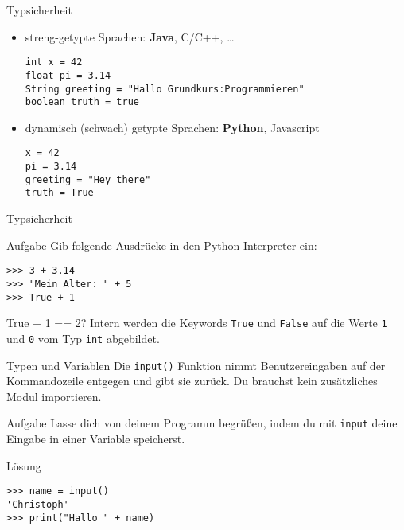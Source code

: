 \begin{frame}[fragile]{Typsicherheit}
 \begin{itemize}
    \item streng-getypte Sprachen: \textbf{Java}, C/C++, \dots
    \begin{lstlisting}
int x = 42
float pi = 3.14
String greeting = "Hallo Grundkurs:Programmieren"
boolean truth = true
    \end{lstlisting}
    \item dynamisch (schwach) getypte Sprachen: \textbf{Python}, Javascript
    \begin{lstlisting}
x = 42
pi = 3.14
greeting = "Hey there"
truth = True
    \end{lstlisting}
\end{itemize}   
\end{frame}

\begin{frame}[fragile]{Typsicherheit}
\begin{block}{Aufgabe}
Gib folgende Ausdrücke in den Python Interpreter ein:
\begin{lstlisting}
>>> 3 + 3.14
>>> "Mein Alter: " + 5
>>> True + 1
\end{lstlisting}
\end{block}
\pause{}
\begin{exampleblock}{True + 1 == 2?}
Intern werden die Keywords \lstinline{True} und \lstinline{False} auf die 
Werte \texttt{1} und \texttt{0} vom Typ \texttt{int} abgebildet.
\end{exampleblock}

\end{frame}


\begin{frame}[fragile]{Typen und Variablen}
    Die \lstinline{input()} Funktion nimmt Benutzereingaben auf der Kommandozeile 
    entgegen und gibt sie zurück. Du brauchst kein zusätzliches Modul importieren.
    \begin{block}{Aufgabe}
       Lasse dich von deinem Programm begrüßen, indem du mit \texttt{input} deine 
       Eingabe in einer Variable speicherst.
    \end{block}
    \pause{}
    \begin{exampleblock}{Lösung}
        \begin{lstlisting}
>>> name = input()
'Christoph'
>>> print("Hallo " + name)
        \end{lstlisting}
    \end{exampleblock}
\end{frame}

